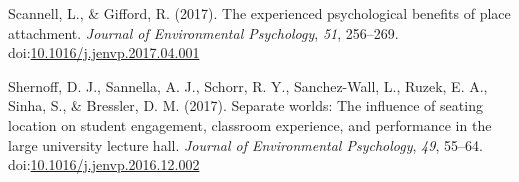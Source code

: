 \documentclass[man]{apa6}
\begin{document}
\leavevmode\hypertarget{ref-scannell_experienced_2017}{}%
Scannell, L., \& Gifford, R. (2017). The experienced psychological benefits of place attachment. \emph{Journal of Environmental Psychology}, \emph{51}, 256--269. doi:\href{https://doi.org/10.1016/j.jenvp.2017.04.001}{10.1016/j.jenvp.2017.04.001}

\leavevmode\hypertarget{ref-shernoff_separate_2017}{}%
Shernoff, D. J., Sannella, A. J., Schorr, R. Y., Sanchez-Wall, L., Ruzek, E. A., Sinha, S., \& Bressler, D. M. (2017). Separate worlds: The influence of seating location on student engagement, classroom experience, and performance in the large university lecture hall. \emph{Journal of Environmental Psychology}, \emph{49}, 55--64. doi:\href{https://doi.org/10.1016/j.jenvp.2016.12.002}{10.1016/j.jenvp.2016.12.002}

\endgroup
\end{document}
